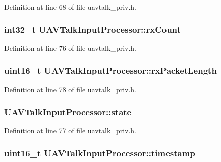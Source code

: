\-Definition at line 68 of file uavtalk\-\_\-priv.\-h.

\hypertarget{struct_u_a_v_talk_input_processor_a478ba62595ad5977cbc9c0897e11ee10}{
\subsubsection[{rx\-Count}]{\setlength{\rightskip}{0pt plus 5cm}int32\-\_\-t {\bf \-U\-A\-V\-Talk\-Input\-Processor\-::rx\-Count}}}\label{struct_u_a_v_talk_input_processor_a478ba62595ad5977cbc9c0897e11ee10}


\-Definition at line 76 of file uavtalk\-\_\-priv.\-h.

\hypertarget{struct_u_a_v_talk_input_processor_a39d9853a0ea6695927ffe0930225cfbe}{
\subsubsection[{rx\-Packet\-Length}]{\setlength{\rightskip}{0pt plus 5cm}uint16\-\_\-t {\bf \-U\-A\-V\-Talk\-Input\-Processor\-::rx\-Packet\-Length}}}\label{struct_u_a_v_talk_input_processor_a39d9853a0ea6695927ffe0930225cfbe}


\-Definition at line 78 of file uavtalk\-\_\-priv.\-h.

\hypertarget{struct_u_a_v_talk_input_processor_ae2d58b353cb569cf8fcb956f1b0b3413}{
\subsubsection[{state}]{ {\bf \-U\-A\-V\-Talk\-Input\-Processor\-::state}}}\label{struct_u_a_v_talk_input_processor_ae2d58b353cb569cf8fcb956f1b0b3413}


\-Definition at line 77 of file uavtalk\-\_\-priv.\-h.

\hypertarget{struct_u_a_v_talk_input_processor_a184962821e9c4b260b39f7bf1c576150}{
\subsubsection[{timestamp}]{\setlength{\rightskip}{0pt plus 5cm}uint16\-\_\-t {\bf \-U\-A\-V\-Talk\-Input\-Processor\-::timestamp}}}\label{struct_u_a_v_talk_input_processor_a184962821e9c4b260b39f7bf1c576150}


